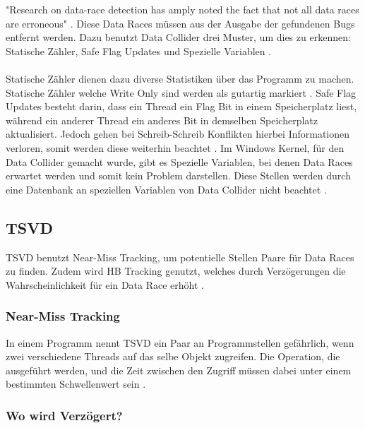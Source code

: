 "Research on data-race detection has amply noted the fact that not all data races are erroneous" \cite[8]{erickson_effective_nodate}. Diese Data Races müssen aus der Ausgabe der gefundenen Bugs entfernt werden. Dazu benutzt Data Collider drei Muster, um dies zu erkennen: Statische Zähler, Safe Flag Updates und Spezielle Variablen \cite[vgl.][8]{erickson_effective_nodate}.\\
\\
Statische Zähler dienen dazu diverse Statistiken über das Programm zu machen. Statische Zähler welche Write Only sind werden als gutartig markiert \cite[vgl.][8]{erickson_effective_nodate}. Safe Flag Updates besteht darin, dass ein Thread ein Flag Bit in einem Speicherplatz liest, während ein anderer Thread ein anderes Bit in demselben Speicherplatz aktualisiert. Jedoch gehen bei Schreib-Schreib Konflikten hierbei Informationen verloren, somit werden diese weiterhin beachtet \cite[vgl.][8]{erickson_effective_nodate}. Im Windows Kernel, für den Data Collider gemacht wurde, gibt es Spezielle Variablen, bei denen Data Races erwartet werden und somit kein Problem darstellen. Diese Stellen werden durch eine Datenbank an speziellen Variablen von Data Collider nicht beachtet \cite[vgl.][8]{erickson_effective_nodate}.

\subsection{TSVD}

\ac{TSVD} benutzt Near-Miss Tracking, um potentielle Stellen Paare für Data Races zu finden. Zudem wird \acs{HB} Tracking genutzt, welches durch Verzögerungen die Wahrscheinlichkeit für ein Data Race erhöht \cite[vgl.][163]{li_efficient_2019}.

\subsubsection*{Near-Miss Tracking}

In einem Programm nennt \acs{TSVD} ein Paar an Programmstellen gefährlich, wenn zwei verschiedene Threads auf das selbe Objekt zugreifen. Die Operation, die ausgeführt werden, und die Zeit zwischen den Zugriff müssen dabei unter einem bestimmten Schwellenwert sein \cite[vgl.][168]{li_efficient_2019}.  

\subsubsection*{Wo wird Verzögert?}

